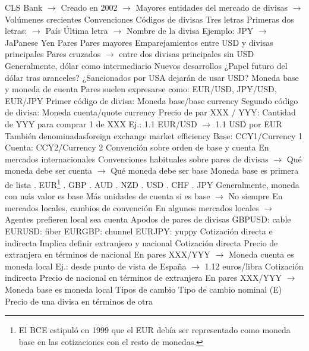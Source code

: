 \documentclass{nuevotema}
\begin{document}
\begin{esquemal}
				\4[] CLS Bank
				\4[] $\to$ Creado en 2002
				\4[] $\to$ Mayores entidades del mercado de divisas
				\4[] $\to$ Volúmenes crecientes
		\2 Convenciones
			\3 Códigos de divisas
				\4 Tres letras
				\4[] Primeras dos letras:
				\4[] $\to$ País
				\4[] Última letra
				\4[] $\to$ Nombre de la divisa
				\4[] Ejemplo:
				\4[] JPY $\to$ JaPanese Yen
			\3 Pares
				\4 Pares mayores
				\4[] Emparejamientos entre USD y divisas principales
				\4 Pares cruzados
				\4[] $\to$ entre dos divisas principales sin USD
				\4[] Generalmente, dólar como intermediario
				\4 Nuevos desarrollos
				\4[] ¿Papel futuro del dólar tras aranceles?
				\4[] ¿Sancionados por USA dejarán de usar USD?
			\3 Moneda base y moneda de cuenta
				\4 Pares suelen expresarse como:
				\4[] EUR/USD, JPY/USD, EUR/JPY
				\4 Primer código de divisa:
				\4[] Moneda base/base currency
				\4 Segundo código de divisa:
				\4[] Moneda cuenta/quote currency
				\4 Precio de par XXX / YYY:
				\4[] Cantidad de YYY para comprar 1 de XXX
				\4[] Ej.: 1.1 EUR/USD
				\4[] $\to$ 1.1 USD por EUR
				\4 También denominadasforeign exchange market efficiency
				\4[] Base: CCY1/Currency 1
				\4[] Cuenta: CCY2/Currency 2
			\3 Convención sobre orden de base y cuenta
				\4 En mercados internacionales
				\4 Convenciones habituales sobre pares de divisas
				\4[] $\to$ Qué moneda debe ser cuenta
				\4[] $\to$ Qué moneda debe ser base
				\4 Moneda base es primera de lista
				. EUR\footnote{El BCE estipuló en 1999 que el EUR debía ser representado como moneda base en las cotizaciones con el resto de monedas.}
				. GBP
				. AUD
				. NZD
				. USD
				. CHF
				. JPY
				\4 Generalmente, moneda con más valor es base
				\4[] Más unidades de cuenta si es base
				\4[] $\to$ No siempre
				\4 En mercados locales, cambios de convención
				\4[] En algunos mercados locales
				\4[] $\to$ Agentes prefieren local sea cuenta
			\3 Apodos de pares de divisas
				\4 GBPUSD: cable
				\4 EURUSD: fiber
				\4 EURGBP: chunnel
				\4 EURJPY: yuppy
			\3 Cotización directa e indirecta
				\4 Implica definir extranjero y nacional
				\4 Cotización directa
				\4[] Precio de extranjera en términos de nacional
				\4[] En pares XXX/YYY
				\4[] $\to$ Moneda cuenta es moneda local
				\4[] Ej.: desde punto de vista de España
				\4[] $\to$ 1.12 euros/libra
				\4 Cotización indirecta
				\4[] Precio de nacional en términos de extranjera
				\4[] En pares XXX/YYY
				\4[] $\to$ Moneda base es moneda local
			\3 Tipos de cambio
				\4 Tipo de cambio nominal (E)
				\4[] Precio de una divisa en términos de otra

\end{esquemal}
\end{document}
